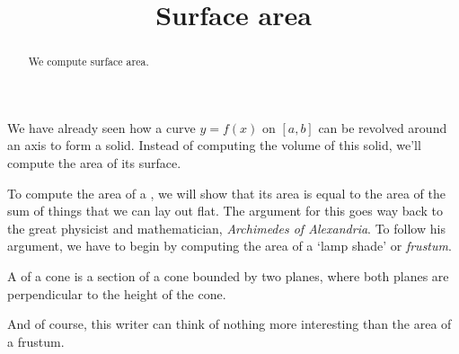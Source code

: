 \documentclass{ximera}
\title[Dig-In:]{Surface area}
\begin{document}
\begin{abstract}
We compute surface area.
\end{abstract}
\maketitle


We have already seen how a curve $y=f(x)$ on $[a,b]$ can be revolved
around an axis to form a solid. Instead of computing the volume of
this solid, we'll compute the area of its surface.

To compute the area of a , we will show
that its area is equal to the area of the sum of things that we can
lay out flat. The argument for this goes way back to the great
physicist and mathematician, \textit{Archimedes of Alexandria}. To follow his
argument, we have to begin by computing the area of a `lamp shade' or
\textit{frustum}.

\begin{definition}
  A  of a cone is a section of a cone bounded by two
  planes, where both planes are perpendicular to the height of the
  cone.
  \begin{image}
  \end{image}
\end{definition}

And of course, this writer can think of nothing more interesting than
the area of a frustum.
\end{document}
